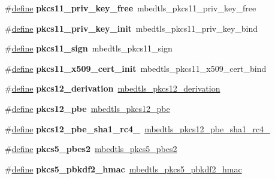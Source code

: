 \begin{DoxyCompactItemize}
\#\hyperlink{structdefine}{define} {\bfseries pkcs11\+\_\+priv\+\_\+key\+\_\+free}~mbedtls\+\_\+pkcs11\+\_\+priv\+\_\+key\+\_\+free
\item 
\mbox{\label{compat-1_83_8h_a7178615c3b948b0295753132b7cab38d}} 
\#\hyperlink{structdefine}{define} {\bfseries pkcs11\+\_\+priv\+\_\+key\+\_\+init}~mbedtls\+\_\+pkcs11\+\_\+priv\+\_\+key\+\_\+bind
\item 
\mbox{\label{compat-1_83_8h_a54f1bafeab5c8d40d1371a4c4cfa0cae}} 
\#\hyperlink{structdefine}{define} {\bfseries pkcs11\+\_\+sign}~mbedtls\+\_\+pkcs11\+\_\+sign
\item 
\mbox{\label{compat-1_83_8h_af503b6a37d44e05a21eba98d84de27e4}} 
\#\hyperlink{structdefine}{define} {\bfseries pkcs11\+\_\+x509\+\_\+cert\+\_\+init}~mbedtls\+\_\+pkcs11\+\_\+x509\+\_\+cert\+\_\+bind
\item 
\mbox{\label{compat-1_83_8h_a4e88b1aa060e1ea46b59d1ac32e0e44e}} 
\#\hyperlink{structdefine}{define} {\bfseries pkcs12\+\_\+derivation}~\hyperlink{pkcs12_8h_a5e58a53e1f2194583f1e48fc2ffef627}{mbedtls\+\_\+pkcs12\+\_\+derivation}
\item 
\mbox{\label{compat-1_83_8h_a129763a606ac988ffd714cc1fd8fc72a}} 
\#\hyperlink{structdefine}{define} {\bfseries pkcs12\+\_\+pbe}~\hyperlink{pkcs12_8h_aeca4c569f386fd7ece7fcfb4efc95a29}{mbedtls\+\_\+pkcs12\+\_\+pbe}
\item 
\mbox{\label{compat-1_83_8h_a34d3ecf684d2debd07279b324ec921e0}} 
\#\hyperlink{structdefine}{define} {\bfseries pkcs12\+\_\+pbe\+\_\+sha1\+\_\+rc4\+\_}~\hyperlink{pkcs12_8h_af865b866a1e1b6f5513f5904f1fdf2fa}{mbedtls\+\_\+pkcs12\+\_\+pbe\+\_\+sha1\+\_\+rc4\+\_}
\item 
\mbox{\label{compat-1_83_8h_aca6e0bd5c314dfe0ac578c46e762db2f}} 
\#\hyperlink{structdefine}{define} {\bfseries pkcs5\+\_\+pbes2}~\hyperlink{pkcs5_8h_aaeb7b4b406e07afe3d8aa807a30d28cd}{mbedtls\+\_\+pkcs5\+\_\+pbes2}
\item 
\mbox{\label{compat-1_83_8h_a787b14965ff5560bc37f7e028bb770fd}} 
\#\hyperlink{structdefine}{define} {\bfseries pkcs5\+\_\+pbkdf2\+\_\+hmac}~\hyperlink{pkcs5_8h_a73ec933de2a4f010604b525640338b1e}{mbedtls\+\_\+pkcs5\+\_\+pbkdf2\+\_\+hmac}

\end{DoxyCompactItemize}
